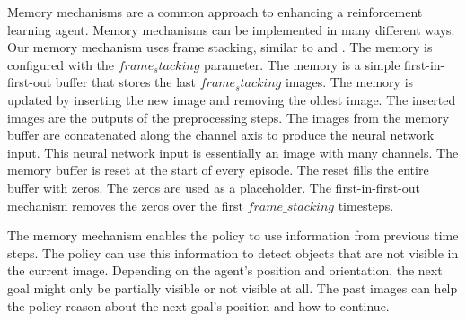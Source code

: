 Memory mechanisms are a common approach to enhancing a reinforcement learning agent. Memory mechanisms can be implemented in many different ways. Our memory mechanism uses frame stacking, similar to \autocite{maximilian} and \autocite{atari}. The memory is configured with the $frame_stacking$ parameter. The memory is a simple first-in-first-out buffer that stores the last $frame_stacking$ images. The memory is updated by inserting the new image and removing the oldest image. The inserted images are the outputs of the preprocessing steps.
The images from the memory buffer are concatenated along the channel axis to produce the neural network input. This neural network input is essentially an image with many channels.
The memory buffer is reset at the start of every episode. The reset fills the entire buffer with zeros. The zeros are used as a placeholder. The first-in-first-out mechanism removes the zeros over the first $frame\_stacking$ timesteps.

The memory mechanism enables the policy to use information from previous time steps. The policy can use this information to detect objects that are not visible in the current image. Depending on the agent's position and orientation, the next goal might only be partially visible or not visible at all. The past images can help the policy reason about the next goal's position and how to continue.



\newcommand{\includePreprocessedImage}[1]{\texttt{[image: Bilder/image\_printer\_images/memory\_mechanism/preprocessed\_image\_step\_\#1.png]}}
\newcommand\timestepT{5}
\newcommand\timestepTminusOne{4}
\newcommand\timestepTminusTwo{3}
\newcommand\timestepTminusThree{2}
\newcommand\timestepTminusFour{1}
\newcommand\imagesOffsetY{0}
\newcommand\inOutImageHeight{0.75}
\newcommand\bufferXOffset{-2}
\newcommand\bufferWidth{7}


\usetikzlibrary{fit}

